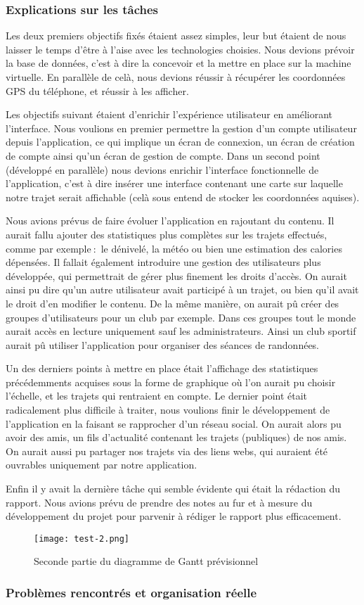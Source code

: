 \subsubsection{Explications sur les tâches}
Les deux premiers objectifs fixés étaient assez simples, leur but étaient de nous laisser le temps d'être à l'aise avec les technologies choisies.
Nous devions prévoir la base de données, c'est à dire la concevoir et la mettre en place sur la machine virtuelle. En parallèle de celà, nous devions réussir à récupérer les coordonnées GPS du téléphone, et réussir à les afficher.
\par
Les objectifs suivant étaient d'enrichir l'expérience utilisateur en améliorant l'interface. Nous voulions en premier permettre la gestion d'un compte utilisateur depuis l'application, ce qui implique un écran de connexion, un écran de création de compte ainsi qu'un écran de gestion de compte.
Dans un second point (développé en parallèle) nous devions enrichir l'interface fonctionnelle de l'application, c'est à dire insérer une interface contenant une carte sur laquelle notre trajet serait affichable (celà sous entend de stocker les coordonnées aquises).
\par
Nous avions prévus de faire évoluer l'application en rajoutant du contenu. Il aurait fallu ajouter des statistiques plus complètes sur les trajets effectués, comme par exemple$\ :$ le dénivelé, la météo ou bien une estimation des calories dépensées.
Il fallait également introduire une gestion des utilisateurs plus développée, qui permettrait de gérer plus finement les droits d'accès. On aurait ainsi pu dire qu'un autre utilisateur avait participé à un trajet, ou bien qu'il avait le droit d'en modifier le contenu.
De la même manière, on aurait pû créer des groupes d'utilisateurs pour un club par exemple. Dans ces groupes tout le monde aurait accès en lecture uniquement sauf les administrateurs. Ainsi un club sportif aurait pû utiliser l'application pour organiser des séances de randonnées.
\par
Un des derniers points à mettre en place était l'affichage des statistiques précédemments acquises sous la forme de graphique où l'on aurait pu choisir l'échelle, et les trajets qui rentraient en compte.
Le dernier point était radicalement plus difficile à traiter, nous voulions finir le développement de l'application en la faisant se rapprocher d'un réseau social. On aurait alors pu avoir des amis, un fils d'actualité contenant les trajets (publiques) de nos amis. On aurait aussi pu partager
nos trajets via des liens webs, qui auraient été ouvrables uniquement par notre application.
\par
Enfin il y avait la dernière tâche qui semble évidente qui était la rédaction du rapport. Nous avions prévu de prendre des notes au fur et à mesure du développement du projet pour parvenir à rédiger le rapport plus efficacement.
\vfill
\begin{figure}[!h]
    \begin{center}
        \texttt{[image: test-2.png]}
        \caption{Seconde partie du diagramme de Gantt prévisionnel}
    \end{center}
\end{figure}
\subsubsection{Problèmes rencontrés et organisation réelle}